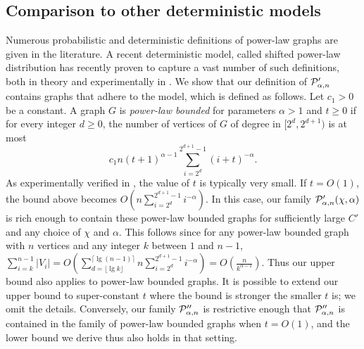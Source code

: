 \subsection{Comparison to other deterministic models}
Numerous probabilistic and  deterministic  definitions of power-law graphs are given in the literature.
A recent deterministic model, called  shifted power-law distribution \cite{eom2011characterizing} has recently proven to capture a vast number of such definitions, both in theory and experimentally in \cite{Sankowski2016PowerLaw}.
We show that our definition of $ \mathcal{P}'_{\alpha,n}$ contains graphs that adhere to the model, which is defined as follows.
 Let $c_1 > 0$ be a constant. A graph $G$ is \emph{power-law bounded} for parameters $\alpha > 1$ and $t\geq 0$ if for every integer $d\geq 0$, the number of vertices of $G$ of degree in $[2^d,2^{d+1})$ is at most
\[
  c_1n(t+1)^{\alpha - 1}\sum_{i = 2^d}^{2^{d+1} - 1}(i+t)^{-\alpha}.
\]
As experimentally verified in \cite{Sankowski2016PowerLaw}, the value of $t$ is typically very small. If $t = O(1)$, the bound above becomes $O(n\sum_{i = 2^d}^{2^{d+1} - 1}i^{-\alpha})$. In this case, our family $ \mathcal{P}'_{\alpha,n}(\chi,\alpha)$ is rich enough to contain these power-law bounded graphs for sufficiently large $C'$ and any choice of $\chi$ and $\alpha$. This follows since for any power-law bounded graph with $n$ vertices and any integer $k$ between $1$ and $n-1$, $\sum_{i = k}^{n-1}{\vert V_i\vert} = O(\sum_{d = \lfloor\lg k\rfloor}^{\lceil\lg(n-1)\rceil}n\sum_{i = 2^d}^{2^{d+1}-1}i^{-\alpha}) = O(\frac{n}{k^{\alpha-1}})$. Thus our upper bound also applies to power-law bounded graphs. It is possible to extend our upper bound to super-constant $t$ where the bound is stronger the smaller $t$ is; we omit the details. Conversely, our family $ \mathcal{P}''_{\alpha,n}$ is restrictive enough that
$ \mathcal{P}''_{\alpha,n}$ is contained in the family of power-law bounded graphs when $t = O(1)$, and the lower bound we derive thus
also holds in that setting.




